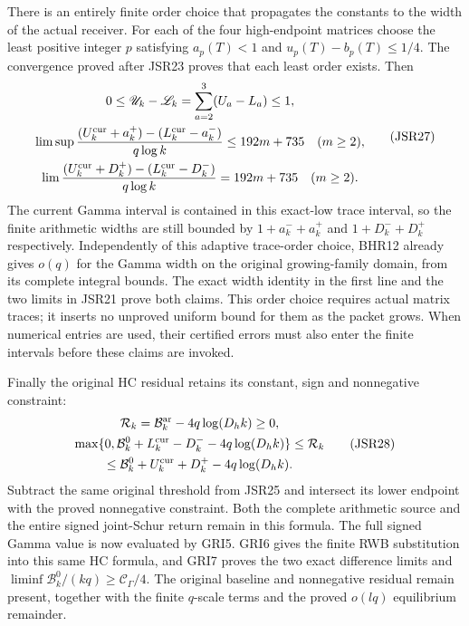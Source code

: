 \documentclass[11pt,a4paper]{article}
\begin{document}
There is an entirely finite order choice that propagates
the constants to the width of the actual receiver.
For each of the four high-endpoint matrices choose the least positive
integer $p$ satisfying $a_p(T)<1$ and
$u_p(T)-b_p(T)\leq1/4$. The convergence proved after
JSR23 proves that each least order exists. Then
\[
\begin{gathered}
 0\leq\mathscr U_k-\mathscr L_k
   =\sum_{a=2}^3(U_a-L_a)\leq1,\\
 \limsup\frac{
   (U_k^{\rm cur}+a_k^+)-(L_k^{\rm cur}-a_k^-)}{q\log k}
   \leq192m+735\quad(m\geq2),\\
 \lim\frac{
   (U_k^{\rm cur}+D_k^+)-(L_k^{\rm cur}-D_k^-)}{q\log k}
   =192m+735\quad(m\geq2).
\end{gathered}\tag{JSR27}
\]
The current Gamma interval is contained in this exact-low
trace interval, so the finite arithmetic widths are still
bounded by $1+a_k^-+a_k^+$ and $1+D_k^-+D_k^+$ respectively.
Independently of this adaptive trace-order choice, BHR12
already gives $o(q)$ for the Gamma width on the original
growing-family domain, from its complete integral bounds.
The exact width identity in the first line and the
two limits in JSR21 prove both claims. This order choice
requires actual matrix traces; it inserts no unproved
uniform bound for them as the packet grows. When numerical
entries are used, their certified errors must also enter
the finite intervals before these claims are invoked.

Finally the original HC residual retains its constant,
sign and nonnegative constraint:
\[
\begin{gathered}
 \mathcal R_k=\mathcal B_k^{\rm ar}-4q\log(D_hk)\geq0,\\
 \max\{0,\mathcal B_k^0+L_k^{\rm cur}-D_k^-
                         -4q\log(D_hk)\}
 \leq\mathcal R_k\\
 \leq\mathcal B_k^0+U_k^{\rm cur}+D_k^+
                         -4q\log(D_hk).
\end{gathered}\tag{JSR28}
\]
Subtract the same original threshold from JSR25 and
intersect its lower endpoint with the proved nonnegative
constraint. Both the complete arithmetic source and the
entire signed joint-Schur return remain in this formula.
The full signed Gamma value is now evaluated by GRI5.
GRI6 gives the finite RWB substitution into this same HC
formula, and GRI7 proves the two exact difference limits
and $\liminf\mathcal B_k^0/(kq)\geq\mathcal C_\Gamma/4$.
The original baseline and nonnegative residual remain
present, together with the finite $q$-scale terms and
the proved $o(lq)$ equilibrium remainder.
\end{document}
